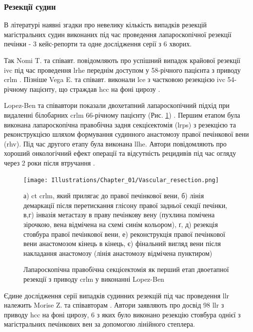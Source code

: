 \begin{refsection}
\subsubsection{Резекції судин}

В літературі наявні згадки про невелику кількість випадків резекцій магістральних судин виконаних під час проведення лапароскопічної резекції печінки - 3 кейс-репорти та одне дослідження серії з 6 хворих. 

Так Nomi T. та співавт. повідомляють про успішний випадок крайової резекції \acrshort{ivc} під час проведення \acrshort{lrhe} переднім доступом у 58-річного пацієнта з приводу \acrshort{crlm} \cite{Nomi2015a}. Пізніше Vega E. та співавт. виконали \acrshort{lce} з частковою резекцією \acrshort{ivc} 54-річному пацієнту, що страждав \acrshort{hcc} на фоні цирозу \cite{Vega2020}. 

Lopez-Ben та співавтори показали двохетапний лапароскопічний підхід при видаленні білобарних \acrshort{crlm} 66-річному пацієнту (Рис. \ref{fig:Vascular_resection}) . Першим етапом була виконана лапароскопічна правобічна задня секцієектомія (\acrshort{lrps}) з резекцією та реконструкцією шляхом формування судинного анастомозу правої печінкової вени (\acrshort{rhv}). Під час другого етапу була виконана \acrshort{llhe}. Автори повідомляють про хороший онкологічний ефект операції та відсутність рецидивів під час огляду через 2 роки після втручання \cite{Lopez-Ben2020}.

\begin{figure}[!ht]
\caption{Лапароскопічна правобічна секцієектомія як перший етап двоетапної резекції з приводу \acrshort{crlm} у виконанні Lopez-Ben \cite{Lopez-Ben2020}}

\texttt{[image: Illustrations/Chapter\_01/Vascular\_resection.png]}
\label{fig:Vascular_resection}

\medskip
\small
а) \acrshort{ct} \acrshort{crlm}, який прилягає до правої печінкової вени, б) лінія демаркації після перетискання глісону правої задньої секції печінки, в,г) інвазія метастазу в праву печінкову вену (пухлина помічена зірочкою, вена відмічена на схемі синім кольором), ґ, д) резекція стовбура правої печінкової вени, е) реконструкція правої печінкової вени анастомозом кінець в кінець, є) фінальний вигляд вени після накладання анастомозу (лінія анастомозу відмічена пунктиром)

\end{figure}
	
Єдине дослідження серії випадків судинних резекцій під час проведення \acrshort{llr} належить Morise Z. та співавторам \cite{Morise2015a}. Автори заявляють про досвід 98 \acrshort{llr} з приводу \acrshort{hcc} на фоні цирозу, 6 з яких було виконано резекцію стовбура однієї з магістральних печінкових вен за допомогою лінійного степлера.


\end{refsection}
